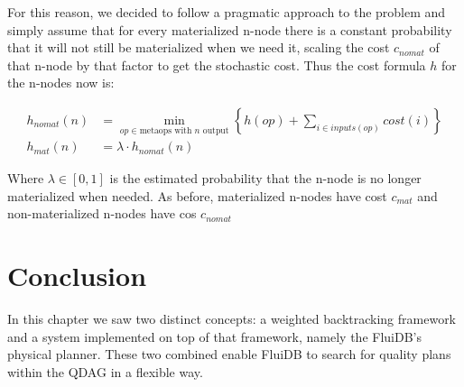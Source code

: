 For this reason, we decided to follow a pragmatic approach to the
problem and simply assume that for every materialized n-node there is a
constant probability that it will not still be materialized when we
need it, scaling the cost \(c_{nomat}\) of that n-node by that factor
to get the stochastic cost. Thus the cost formula \(h\) for the n-nodes
now is:

\begin{align*}
  h_{nomat}(n) &= \min\limits_{op \in \text{metaops with \(n\) output}} \left\{ h(op) + \sum\limits_{i \in inputs(op)} cost(i)  \right\} \\
  h_{mat}(n) &= \lambda \cdot h_{nomat}(n)
\end{align*}

Where \(\lambda \in [0,1]\) is the estimated probability that the
n-node is no longer materialized when needed. As before, materialized
n-nodes have cost \(c_{mat}\) and non-materialized n-nodes have cos
\(c_{nomat}\)

\section{Conclusion}

In this chapter we saw two distinct concepts: a weighted backtracking
framework and a system implemented on top of that framework, namely
the FluiDB's physical planner. These two combined enable FluiDB to
search for quality plans within the QDAG in a flexible way.
